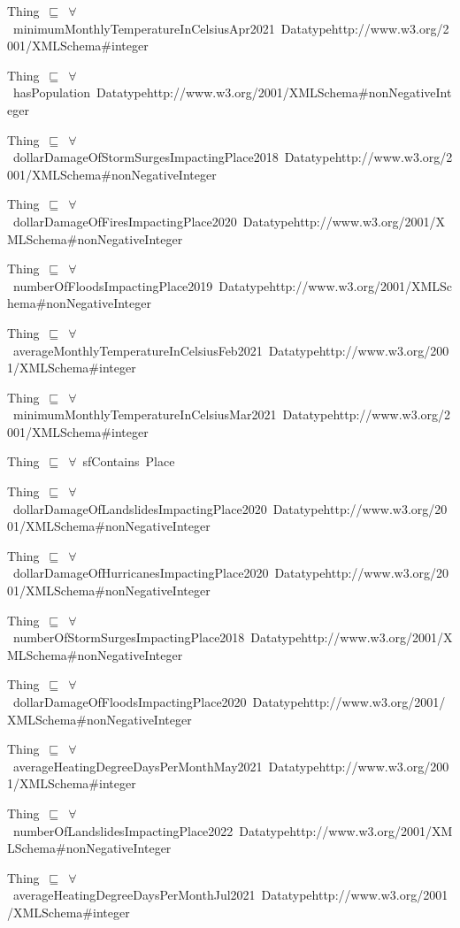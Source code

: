 \documentclass{article}
\begin{document}
Thing~\ensuremath{\sqsubseteq}~\ensuremath{\forall}~minimumMonthlyTemperatureInCelsiusApr2021~Datatypehttp://www.w3.org/2001/XMLSchema#integer~

Thing~\ensuremath{\sqsubseteq}~\ensuremath{\forall}~hasPopulation~Datatypehttp://www.w3.org/2001/XMLSchema#nonNegativeInteger~

Thing~\ensuremath{\sqsubseteq}~\ensuremath{\forall}~dollarDamageOfStormSurgesImpactingPlace2018~Datatypehttp://www.w3.org/2001/XMLSchema#nonNegativeInteger~

Thing~\ensuremath{\sqsubseteq}~\ensuremath{\forall}~dollarDamageOfFiresImpactingPlace2020~Datatypehttp://www.w3.org/2001/XMLSchema#nonNegativeInteger~

Thing~\ensuremath{\sqsubseteq}~\ensuremath{\forall}~numberOfFloodsImpactingPlace2019~Datatypehttp://www.w3.org/2001/XMLSchema#nonNegativeInteger~

Thing~\ensuremath{\sqsubseteq}~\ensuremath{\forall}~averageMonthlyTemperatureInCelsiusFeb2021~Datatypehttp://www.w3.org/2001/XMLSchema#integer~

Thing~\ensuremath{\sqsubseteq}~\ensuremath{\forall}~minimumMonthlyTemperatureInCelsiusMar2021~Datatypehttp://www.w3.org/2001/XMLSchema#integer~

Thing~\ensuremath{\sqsubseteq}~\ensuremath{\forall}~sfContains~Place~

Thing~\ensuremath{\sqsubseteq}~\ensuremath{\forall}~dollarDamageOfLandslidesImpactingPlace2020~Datatypehttp://www.w3.org/2001/XMLSchema#nonNegativeInteger~

Thing~\ensuremath{\sqsubseteq}~\ensuremath{\forall}~dollarDamageOfHurricanesImpactingPlace2020~Datatypehttp://www.w3.org/2001/XMLSchema#nonNegativeInteger~

Thing~\ensuremath{\sqsubseteq}~\ensuremath{\forall}~numberOfStormSurgesImpactingPlace2018~Datatypehttp://www.w3.org/2001/XMLSchema#nonNegativeInteger~

Thing~\ensuremath{\sqsubseteq}~\ensuremath{\forall}~dollarDamageOfFloodsImpactingPlace2020~Datatypehttp://www.w3.org/2001/XMLSchema#nonNegativeInteger~

Thing~\ensuremath{\sqsubseteq}~\ensuremath{\forall}~averageHeatingDegreeDaysPerMonthMay2021~Datatypehttp://www.w3.org/2001/XMLSchema#integer~

Thing~\ensuremath{\sqsubseteq}~\ensuremath{\forall}~numberOfLandslidesImpactingPlace2022~Datatypehttp://www.w3.org/2001/XMLSchema#nonNegativeInteger~

Thing~\ensuremath{\sqsubseteq}~\ensuremath{\forall}~averageHeatingDegreeDaysPerMonthJul2021~Datatypehttp://www.w3.org/2001/XMLSchema#integer~
\end{document}
